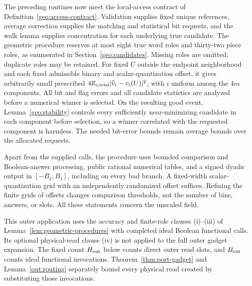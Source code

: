 The preceding routines now meet the local-access contract of
Definition~\ref{geo:access-contract}. Validation supplies fixed unique
references, average correction supplies the matching and statistical bit
requests, and the walk lemma supplies concentration for each underlying
true candidate. The geometric procedure reserves at most eight true word
roles and thirty-two piece roles, as enumerated in
Section~\ref{geo:candidates}. Missing roles are omitted; duplicate roles
may be retained.
For fixed $U$ outside the endpoint neighborhood and each fixed admissible
binary and scalar-quantization offset, it gives arbitrarily small
prescribed $4\mathbb{E}_{i,\mathrm{trial}}|\widehat v_i-v_i(U)|^2$, with $i$
uniform among the $4m$ components. All bit and flag errors and all
candidate statistics are analyzed before a numerical winner is selected.
On the resulting good event, Lemma~\ref{geo:stability} controls every
sufficiently near-minimizing candidate in each component before selection, so a winner correlated with
the requested component is harmless. The needed bit-error bounds remain
average bounds over the allocated requests.

Apart from the supplied calls, the procedure uses bounded comparison and
Boolean-answer processing, public rational numerical tables, and a
signed dyadic output in $[-B_1,B_1]$, including on every bad branch.
A fixed-width scalar-quantization grid with an independently randomized
offset suffices. Refining the finite grids of offsets changes comparison
thresholds, not the number of bins, answers, or slots. All these
statements concern the unscaled field.

This outer application uses the accuracy and finite-role clauses
\textup{(i)}--\textup{(iii)} of
Lemma~\ref{lem:geometric-procedures} with completed ideal Boolean
functional calls. Its optional physical-read clause \textup{(iv)} is
not applied to the full outer gadget expansion. The fixed count
$H_{\rm out}$ below counts direct outer read slots, and $B_{\rm out}$
counts ideal functional invocations. Theorem~\ref{thm:port-gadget} and
Lemma~\ref{out:routing} separately bound every physical read created by
substituting those invocations.

